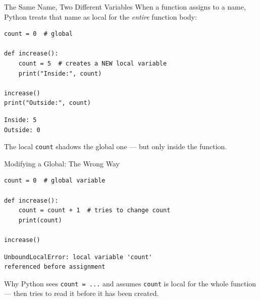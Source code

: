 \documentclass[9pt,aspectratio=169,xcolor=table]{beamer}
\begin{document}
\begin{frame}[fragile]{The Same Name, Two Different Variables}
    \leavevmode
    When a function \alert{assigns} to a name, Python treats that name
    as local for the \emph{entire} function body:

\begin{lstlisting}
count = 0  # global

def increase():
    count = 5  # creates a NEW local variable
    print("Inside:", count)

increase()
print("Outside:", count)
\end{lstlisting}
\begin{lstlisting}[style=skoutput]
Inside: 5
Outside: 0
\end{lstlisting}

    \vspace{1mm}
    {\small The local \texttt{count} \alert{shadows} the global one ---
    but only inside the function.}
\end{frame}

\begin{frame}[fragile]{Modifying a Global: The Wrong Way}
    \leavevmode
\begin{lstlisting}
count = 0  # global variable

def increase():
    count = count + 1  # tries to change count
    print(count)

increase()
\end{lstlisting}
\begin{lstlisting}[style=skoutput]
UnboundLocalError: local variable 'count'
referenced before assignment
\end{lstlisting}

    \vspace{1mm}
    \begin{alertblock}{Why}
        Python sees \texttt{count = ...} and assumes \texttt{count} is
        local for the \alert{whole} function --- then tries to read it
        before it has been created.
    \end{alertblock}
\end{frame}
\end{document}
